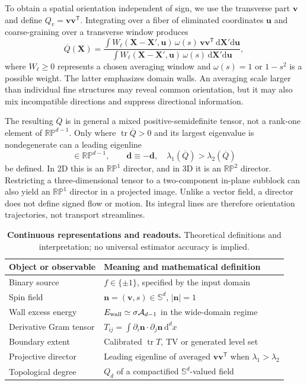 \documentclass[11pt,a4paper]{article}
\newcommand{\nn}{\bm n}
\newcommand{\vv}{\bm v}
\newcommand{\dd}{\mathrm{d}}
\newcommand{\RP}{\mathbb{RP}}
\newcommand{\Sn}{\mathbb S}
\newcommand{\Tr}{\operatorname{tr}}
\newcommand{\diff}{\partial}
\begin{document}
To obtain a spatial orientation independent of sign, we use the transverse part \(\vv\) and define \(Q_v=\vv\vv^{\mathsf T}\). Integrating over a fiber of eliminated coordinates \(\bm u\) and coarse-graining over a transverse window produces
\begin{equation}
 \overline Q(\bm X)=\frac{\displaystyle\int W_\ell(\bm X-\bm X',\bm u)\,\omega(s)\,\vv\vv^{\mathsf T}\,\dd\bm X'\dd\bm u}
 {\displaystyle\int W_\ell(\bm X-\bm X',\bm u)\,\omega(s)\,\dd\bm X'\dd\bm u},
 \label{eq:projector}
\end{equation}
where \(W_\ell\ge0\) represents a chosen averaging window and \(\omega(s)=1\) or \(1-s^2\) is a possible weight. The latter emphasizes domain walls. An averaging scale larger than individual fine structures may reveal common orientation, but it may also mix incompatible directions and suppress directional information.

The resulting \(\overline Q\) is in general a mixed positive-semidefinite tensor, not a rank-one element of \(\RP^{d-1}\). Only where \(\Tr\overline Q>0\) and its largest eigenvalue is nondegenerate can a leading eigenline
\begin{equation}
 [\bm d(\bm X)]\in\RP^{d-1},\qquad \bm d\equiv-\bm d,
 \quad\lambda_1(\overline Q)>\lambda_2(\overline Q)
 \label{eq:director}
\end{equation}
be defined. In 2D this is an \(\RP^1\) director, and in 3D it is an \(\RP^2\) director. Restricting a three-dimensional tensor to a two-component in-plane subblock can also yield an \(\RP^1\) director in a projected image. Unlike a vector field, a director does not define signed flow or motion. Its integral lines are therefore orientation trajectories, not transport streamlines.

\begin{table}[t]
\centering\caption{\textbf{Continuous representations and readouts.} Theoretical definitions and interpretation; no universal estimator accuracy is implied.}\label{tab:framework}
\small\begin{tabularx}{\linewidth}{@{}p{.26\linewidth}X@{}}\toprule
Object or observable & Meaning and mathematical definition\\\midrule
Binary source & \(f\in\{\pm1\}\), specified by the input domain\\
Spin field & \(\nn=(\vv,s)\in\Sn^d\), \(|\nn|=1\)\\
Wall excess energy & \(E_{\rm wall}\simeq\sigma\mathcal A_{d-1}\) in the wide-domain regime\\
Derivative Gram tensor & \(T_{ij}=\int \diff_i\nn\cdot\diff_j\nn\,\dd^dx\)\\
Boundary extent & Calibrated \(\Tr T\), TV or generated level set\\
Projective director & Leading eigenline of averaged \(\vv\vv^{\mathsf T}\) when \(\lambda_1>\lambda_2\)\\
Topological degree & \(Q_d\) of a compactified \(\Sn^d\)-valued field\\\bottomrule
\end{tabularx}\end{table}
\end{document}
